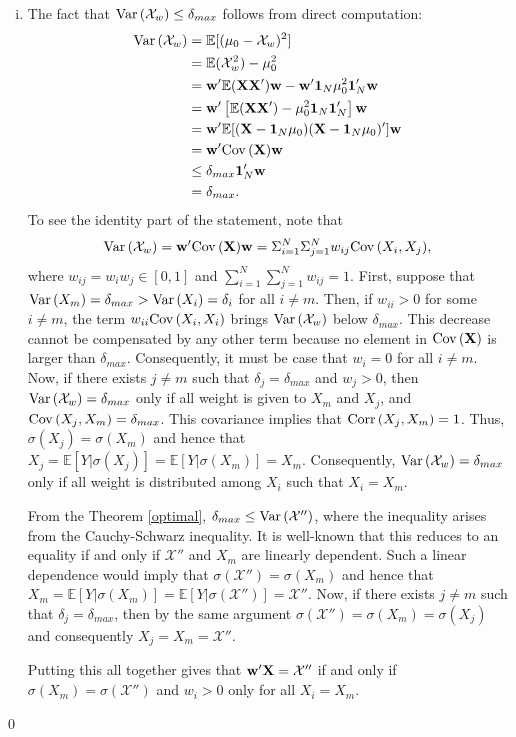 \documentclass[11pt]{article}
\newcommand{\E}{\mathbb{E}}
\theoremstyle{definition}
\theoremstyle{definition}
\def\one{{\bf 1}}
\def\w{{\bf w}}
\def\X{{\bf X}}
\def\E{{\mathbb E}}
\def\Var{{\rm Var}\,}
\def\Cov{{\rm Cov}\,}
\def\Corr{{\rm Corr}\,}
\begin{document}
\begin{enumerate}[i)]

\item The fact that $\Var(\mathcal{X}_w)\leq \delta_{max}$ follows from direct computation:
\begin{align*}
\Var(\mathcal{X}_w) &= \E[(\mu_0 - \mathcal{X}_w)^2]\\
&= \E(\mathcal{X}_w^2) - \mu_0^2\\
&= \w' \E(\X \X')\w - \w'\one_N \mu_0^2\one_N'\w\\
&= \w' \left[ \E(\X \X') - \mu_0^2 \one_N \one_N' \right]\w\\
&= \w' \E[(\X - \one_N \mu_0)(\X - \one_N \mu_0)']\w\\
&= \w' \Cov(\X)\w\\
&\leq \delta_{max} \one_N'\w\\
&= \delta_{max}.
\end{align*}
To see the identity part of the statement, note that $$\Var(\mathcal{X}_w)  = \w' \Cov(\X)\w = \Sigma_{i=1}^N \Sigma_{j=1}^N w_{ij} \Cov(X_i, X_j),$$ where $w_{ij} = w_iw_j \in [0,1]$ and $\sum_{i=1}^N \sum_{j=1}^N w_{ij} = 1$.  First, suppose that $\Var(X_m) = \delta_{max} > \Var(X_i) = \delta_i$ for all $i \neq m$. Then, if $w_{ii} > 0$ for some $i \neq m$, the term $w_{ii}\Cov(X_i, X_i)$ brings $\Var(\mathcal{X}_w)$ below $\delta_{max}$. This decrease cannot be compensated by any other term because no element in $\Cov(\X)$ is larger than $\delta_{max}$. Consequently, it must be case that $w_i = 0$ for all $i \neq m$. Now, if there exists $j \neq m$ such that $\delta_j = \delta_{max}$ and $w_j > 0$, then $\Var(\mathcal{X}_w) = \delta_{max}$ only if all weight is given to $X_m$ and $X_j$, and $\Cov(X_j, X_m) = \delta_{max}$. This covariance implies that $\Corr(X_j, X_m) = 1$. Thus, $\sigma(X_j) = \sigma(X_m)$ and hence that $X_j = \E[Y | \sigma(X_j)] = \E[Y | \sigma(X_m)] = X_m$. Consequently, $\Var(\mathcal{X}_w) = \delta_{max}$ only if all weight is distributed among $X_i$ such that $X_i = X_m$. 

 From the Theorem \ref{optimal}, $\delta_{max} \leq \Var(\mathcal{X}'')$, where the inequality arises from the Cauchy-Schwarz inequality. It is well-known that this reduces to an equality if and only if $\mathcal{X}''$ and $X_m$ are linearly dependent. Such a linear dependence would imply that $\sigma(\mathcal{X}'') = \sigma(X_m)$ and hence that $X_m = \E[Y | \sigma(X_m)] = \E[Y | \sigma(\mathcal{X}'')] = \mathcal{X}''$. Now, if there exists $j \neq m$ such that $\delta_j = \delta_{max}$, then by the same argument $\sigma(\mathcal{X}'') = \sigma(X_m) = \sigma(X_j)$ and consequently $X_j = X_m = \mathcal{X}''$. 

Putting this all together gives that $\w'\X = \mathcal{X}''$ if and only if $\sigma(X_m) = \sigma(\mathcal{X}'')$ and $w_i > 0$ only for all $X_i = X_m$.

\end{enumerate}
\qed
\end{document}
